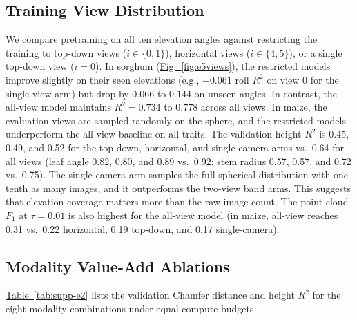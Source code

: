 \documentclass[10pt,twocolumn,letterpaper]{article}
\newcommand{\figref}[1]{\hyperref[#1]{Fig.~\ref*{#1}}}
\newcommand{\tabref}[1]{\hyperref[#1]{Table~\ref*{#1}}}
\begin{document}
\subsection{Training View Distribution}
\label{app:views-full}

We compare pretraining on all ten elevation angles against restricting the training to top-down views ($i \in \{0,1\}$), horizontal views ($i \in \{4,5\}$), or a single top-down view ($i = 0$). In sorghum (\figref{fig:e5views}), the restricted models improve slightly on their seen elevations (e.g., $+0.061$ roll $R^2$ on view 0 for the single-view arm) but drop by $0.066$ to $0.144$ on unseen angles. In contrast, the all-view model maintains $R^2 = 0.734$ to $0.778$ across all views. In maize, the evaluation views are sampled randomly on the sphere, and the restricted models underperform the all-view baseline on all traits. The validation height $R^2$ is 0.45, 0.49, and 0.52 for the top-down, horizontal, and single-camera arms vs.\ 0.64 for all views (leaf angle 0.82, 0.80, and 0.89 vs.\ 0.92; stem radius 0.57, 0.57, and 0.72 vs.\ 0.75). The single-camera arm samples the full spherical distribution with one-tenth as many images, and it outperforms the two-view band arms. This suggests that elevation coverage matters more than the raw image count. The point-cloud $F_1$ at $\tau = 0.01$ is also highest for the all-view model (in maize, all-view reaches 0.31 vs.\ 0.22 horizontal, 0.19 top-down, and 0.17 single-camera).

\subsection{Modality Value-Add Ablations}
\tabref{tab:supp-e2} lists the validation Chamfer distance and height $R^2$ for the eight modality combinations under equal compute budgets.
\end{document}
